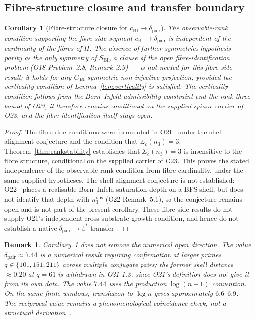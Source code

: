 \documentclass[11pt,a4paper]{article}
\newtheorem{corollary}[theorem]{Corollary}
\newtheorem{remark}[theorem]{Remark}
\newcommand{\bstar}{\beta^*}
\newcommand{\dpair}{\delta_{\mathrm{pair}}}
\newcommand{\GBI}{G_{\mathrm{BI}}}
\newcommand{\SBI}{S_{\mathrm{BI}}}
\newcommand{\cchi}{c_{\mathrm{BI}}}
\begin{document}
  \subsection{Fibre-structure closure and transfer boundary}
    \label{sec:transfer}

    \begin{corollary}[Fibre-structure closure for $\cchi \to \dpair$]
      \label{cor:transfer}
      The observable-rank condition supporting the fibre-side segment
      $\cchi \to \dpair$ is independent of the cardinality of the
      fibres of $\Pi$.
      The absence-of-further-symmetries hypothesis --- parity as the only symmetry of $\SBI$,
      a clause of the open fibre-identification problem (O18 Problem~2.8, Remark~2.9) --- is
      not needed for this fibre-side result:
      it holds for any $\GBI$-symmetric non-injective projection,
      provided the verticality condition of Lemma~\ref{lem:verticality} is satisfied.
      The verticality condition follows from the Born--Infeld admissibility constraint
      and the rank-three bound of O23; it therefore remains conditional on the supplied
      spinor carrier of O23, and the fibre identification itself stays open.
    \end{corollary}

    \begin{proof}
      The fibre-side conditions were formulated in
      O21~\cite{Beau2026a25} under the shell-alignment conjecture and the condition
      that $\Sigma_c(n_3) = 3$.
      Theorem~\ref{thm:rankstability} establishes that $\Sigma_c(n_3) = 3$ is insensitive to
      the fibre structure, conditional on the supplied carrier of O23.
      This proves the stated independence of the observable-rank condition from fibre
      cardinality, under the same supplied hypotheses.
      The shell-alignment conjecture is not established:
      O22~\cite{Beau2026a26} places a realisable Born--Infeld saturation depth on a BFS shell,
      but does not identify that depth with $n_3^{\mathrm{obs}}$ (O22 Remark~5.1), so the
      conjecture remains open and is not part of the present corollary.
      These fibre-side results do not supply O21's independent cross-substrate growth condition, and hence do not
      establish a native $\dpair \to \bstar$ transfer~\cite{Beau2026sgn}.
    \end{proof}

    \begin{remark}
      Corollary~\ref{cor:transfer} does not remove the numerical open direction.
      The value $\dpair \approx 7.44$ is a numerical result requiring confirmation at larger
      primes $q \in \{101, 151, 211\}$ across multiple conjugate pairs; the former shell distance
      $\approx 0.20$ at $q = 61$ is withdrawn in O21 1.3, since O21's definition does not give it from
      its own data.
      The value $7.44$ uses the production $\log(n+1)$ convention.
      On the same finite windows, translation to $\log n$ gives approximately $6.6$--$6.9$.
      The reciprocal value remains a phenomenological coincidence check, not a structural
      derivation~\cite{Beau2026sgn}.
    \end{remark}
\end{document}
